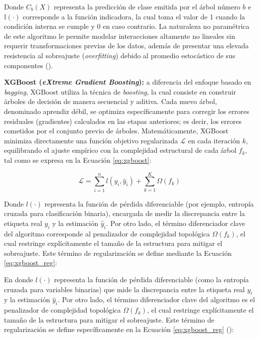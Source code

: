 Donde $C_b(X)$ representa la predicción de clase emitida por el árbol número $b$ e $\mathbb{I}(\cdot)$ corresponde a la función indicadora, la cual toma el valor de 1 cuando la condición interna se cumple y 0 en caso contrario. La naturaleza no paramétrica de este algoritmo le permite modelar interacciones altamente no lineales sin requerir transformaciones previas de los datos, además de presentar una elevada resistencia al sobreajuste (\textit{overfitting}) debido al promedio estocástico de sus componentes (\cite{hastie2009elements}).

\textbf{XGBoost (\textit{eXtreme Gradient Boosting}):} a diferencia del enfoque basado en \textit{bagging}, XGBoost utiliza la técnica de \textit{boosting}, la cual consiste en construir árboles de decisión de manera secuencial y aditiva. Cada nuevo árbol, denominado aprendiz débil, se optimiza específicamente para corregir los errores residuales (gradientes) calculados en las etapas anteriores; es decir, los errores cometidos por el conjunto previo de árboles. Matemáticamente, XGBoost minimiza directamente una función objetivo regularizada $\mathcal{L}$ en cada iteración $k$, equilibrando el ajuste empírico con la complejidad estructural de cada árbol $f_k$, tal como se expresa en la Ecuación \ref{eq:xgboost}:

\begin{equation}
    \mathcal{L} = \sum_{i=1}^{n} l(y_i, \hat{y}_i) + \sum_{k=1}^{K} \Omega(f_k)
    \label{eq:xgboost}
\end{equation}

Donde $l(\cdot)$ representa la función de pérdida diferenciable (por ejemplo, entropía cruzada para clasificación binaria), encargada de medir la discrepancia entre la etiqueta real $y_i$ y la estimación $\hat{y}_i$. Por otro lado, el término diferenciador clave del algoritmo corresponde al penalizador de complejidad topológica $\Omega(f_k)$, el cual restringe explícitamente el tamaño de la estructura para mitigar el sobreajuste. Este término de regularización se define mediante la Ecuación \ref{eq:xgboost_reg}:

En donde $l(\cdot)$ representa la función de pérdida diferenciable (como la entropía cruzada para variables binarias) que mide la discrepancia entre la etiqueta real $y_i$ y la estimación $\hat{y}_i$. Por otro lado, el término diferenciador clave del algoritmo es el penalizador de complejidad topológica $\Omega(f_k)$, el cual restringe explícitamente el tamaño de la estructura para mitigar el sobreajuste. Este término de regularización se define específicamente en la Ecuación \ref{eq:xgboost_reg} (\cite{chen2016xgboost}):

